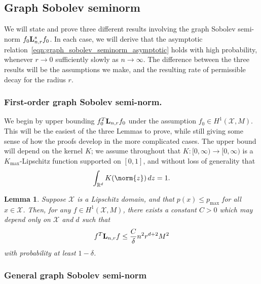 \documentclass{article}
\newcommand{\Reals}{\mathbb{R}}
\newcommand{\1}{\mathbf{1}}
\newcommand{\Lap}{{\bf L}}
\newcommand{\Xset}{\mathcal{X}}
\theoremstyle{alden}
\theoremstyle{aldenthm}
\newtheorem{lemma}{Lemma}
\theoremstyle{definition}
\theoremstyle{remark}
\begin{document}
\subsection{Graph Sobolev seminorm}
We will state and prove three different results involving the graph Sobolev semi-norm $f_0 \Lap_{n,r}^s f_0$. In each case, we will derive that the asymptotic relation~\eqref{eqn:graph_sobolev_seminorm_asymptotic} holds with high probability, whenever $r \to 0$ sufficiently slowly as $n \to \infty$. The difference between the three results will be the assumptions we make, and the resulting rate of permissible decay for the radius $r$. 

\subsubsection{First-order graph Sobolev semi-norm.}
We begin by upper bounding $f_0^T \Lap_{n,r} f_0$ under the assumption $f_0 \in H^1(\Xset,M)$. This will be the easiest of the three Lemmas to prove, while still giving some sense of how the proofs develop in the more complicated cases. The upper bound will depend on the kernel $K$; we assume throughout that $K:[0,\infty) \to [0,\infty)$ is a $K_{\max}$-Lipschitz function supported on $[0,1]$, and without loss of generality that
\begin{equation*}
\int_{\Reals^d} K(\norm{z}) \,dz = 1.
\end{equation*}
\begin{lemma}
	\label{lem:first_order_graph_sobolev_seminorm}
	Suppose $\Xset$ is a Lipschitz domain, and that $p(x) \leq p_{\max}$ for all $x \in \Xset$. Then, for any $f \in H^1(\Xset,M)$, there exists a constant $C > 0$ which may depend only on $\Xset$ and $d$ such that
	\begin{equation}
	f^T \Lap_{n,r} f \leq \frac{C}{\delta} n^2 r^{d + 2} M^2
	\end{equation}
	with probability at least $1 - \delta$.
\end{lemma}

\subsubsection{General graph Sobolev semi-norm}
\end{document}
